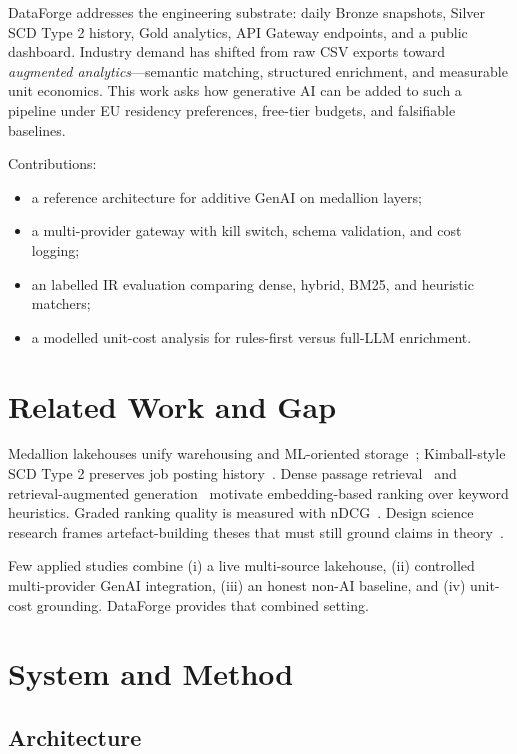 \documentclass[conference]{IEEEtran}
\begin{document}
DataForge addresses the engineering substrate: daily Bronze snapshots, Silver SCD Type 2 history, Gold analytics, API Gateway endpoints, and a public dashboard.
Industry demand has shifted from raw CSV exports toward \emph{augmented analytics}---semantic matching, structured enrichment, and measurable unit economics.
This work asks how generative AI can be added to such a pipeline under EU residency preferences, free-tier budgets, and falsifiable baselines.

Contributions:
\begin{itemize}
  \item a reference architecture for additive GenAI on medallion layers;
  \item a multi-provider gateway with kill switch, schema validation, and cost logging;
  \item an labelled IR evaluation comparing dense, hybrid, BM25, and heuristic matchers;
  \item a modelled unit-cost analysis for rules-first versus full-LLM enrichment.
\end{itemize}

\section{Related Work and Gap}
\label{sec:related}

Medallion lakehouses unify warehousing and ML-oriented storage~\cite{armbrust2021lakehouse}; Kimball-style SCD Type 2 preserves job posting history~\cite{kimball2013dwt}.
Dense passage retrieval~\cite{karpukhin2020dpr} and retrieval-augmented generation~\cite{lewis2020rag} motivate embedding-based ranking over keyword heuristics.
Graded ranking quality is measured with nDCG~\cite{jarvelin2002ndcg}.
Design science research frames artefact-building theses that must still ground claims in theory~\cite{hevner2004dsr}.

Few applied studies combine (i) a live multi-source lakehouse, (ii) controlled multi-provider GenAI integration, (iii) an honest non-AI baseline, and (iv) unit-cost grounding.
DataForge provides that combined setting.

\section{System and Method}
\label{sec:method}

\subsection{Architecture}
\end{document}
